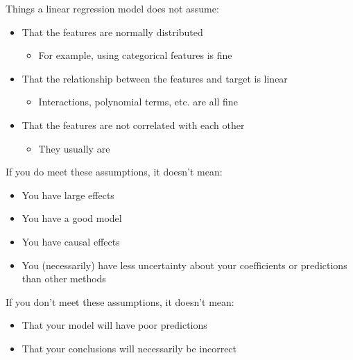 \documentclass[
  letterpaper,
]{krantz}
\providecommand{\tightlist}{%
  \setlength{\itemsep}{0pt}\setlength{\parskip}{0pt}}\usepackage{longtable,booktabs,array}
\begin{document}
Things a linear regression model does not assume:

\begin{itemize}
\tightlist
\item
  That the features are normally distributed

  \begin{itemize}
  \tightlist
  \item
    For example, using categorical features is fine
  \end{itemize}
\item
  That the relationship between the features and target is linear

  \begin{itemize}
  \tightlist
  \item
    Interactions, polynomial terms, etc. are all fine
  \end{itemize}
\item
  That the features are not correlated with each other

  \begin{itemize}
  \tightlist
  \item
    They usually are
  \end{itemize}
\end{itemize}

If you do meet these assumptions, it doesn't mean:

\begin{itemize}
\tightlist
\item
  You have large effects
\item
  You have a good model
\item
  You have causal effects
\item
  You (necessarily) have less uncertainty about your coefficients or
  predictions than other methods
\end{itemize}

If you don't meet these assumptions, it doesn't mean:

\begin{itemize}
\tightlist
\item
  That your model will have poor predictions
\item
  That your conclusions will necessarily be incorrect
\end{itemize}
\end{document}
